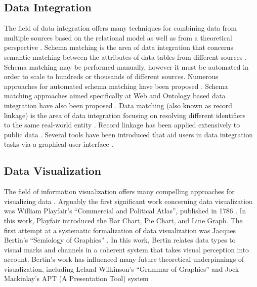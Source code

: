 \subsection{Data Integration}
The field of data integration offers many techniques for combining data from multiple sources based on the relational model \cite{doan2012principles} as well as from a theoretical perspective \cite{lenzerini2002data, halevy2006data, ziegler2004three}. Schema matching is the area of data integration that concerns semantic matching between the attributes of data tables from different sources \cite{rahm2001survey, fagin2003data}. Schema matching may be performed manually, however it must be automated in order to scale to hundreds or thousands of different sources. Numerous approaches for automated schema matching have been proposed \cite{shvaiko2005survey, doan2001reconciling, kang2003schema, milo1998using, madhavan2001generic, doan2000learning}. Schema matching approaches aimed specifically at Web and Ontology based data integration have also been proposed \cite{he2003statistical, noy2004semantic, doan2005semantic, madhavan2007web, kalfoglou2003ontology, noy2009ontology, uschold2004ontologies, wache2001ontology, noy2003prompt, euzenat2007ontology}. Data matching (also known as record linkage) is the area of data integration focusing on resolving different identifiers to the same real-world entity \cite{winkler1999state, winkler2006overview, koudas2006record, aizawa2005fast, gu2003record, winkler1995matching}. Record linkage has been applied extensively to public data \cite{jaro1995probabilistic, jaro1989advances, holman1999population}. Several tools have been introduced that aid users in data integration tasks via a graphical user interface \cite{christen2008febrl, kandel2011wrangler, elfeky2002tailor}.

\subsection{Data Visualization}
The field of information visualization offers many compelling approaches for visualizing data \cite{keim2002information}. Arguably the first significant work concerning data visualization was William Playfair's ``Commercial and Political Atlas'', published in 1786 \cite{playfair1786commercial}. In this work, Playfair introduced the Bar Chart, Pie Chart, and Line Graph. The first attempt at a systematic formalization of data visualization was Jacques Bertin's ``Semiology of Graphics'' \cite{bertin1983semiology}. In this work, Bertin relates data types to visual marks and channels in a coherent system that takes visual perception into account. Bertin's work has influenced many future theoretical underpinnings of visualization, including Leland Wilkinson's ``Grammar of Graphics'' \cite{wilkinson2005grammar} and Jock Mackinlay's APT (A Presentation Tool) system \cite{mackinlay1986automating}.

